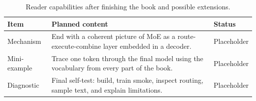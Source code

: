 \begin{table}[H]
\centering
\caption{Reader capabilities after finishing the book and possible extensions.}
\label{tab:ch12-book-summary-and-next-steps}
\begin{tabularx}{\textwidth}{p{}X p{}}
\toprule
Item & Planned content & Status \\
\midrule
Mechanism & End with a coherent picture of MoE as a route-execute-combine layer embedded in a decoder. & Placeholder \\
Mini-example & Trace one token through the final model using the vocabulary from every part of the book. & Placeholder \\
Diagnostic & Final self-test: build, train smoke, inspect routing, sample text, and explain limitations. & Placeholder \\
\bottomrule
\end{tabularx}
\end{table}
